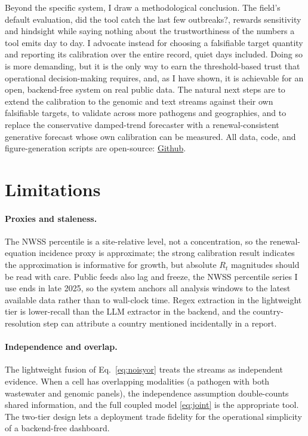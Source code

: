 \documentclass[10pt,twocolumn]{article}
\theoremstyle{definition}
\newcommand{\Rt}{R_t}
\newcommand{\github}{\href{https://github.com/aravinds-kannappan/MOSAIC}{Github}}
\begin{document}
Beyond the specific system, I draw a methodological conclusion. The field's
default evaluation, did the tool catch the last few outbreaks?, rewards
sensitivity and hindsight while saying nothing about the trustworthiness of the
numbers a tool emits day to day. I advocate instead for choosing a falsifiable
target quantity and reporting its calibration over the entire record, quiet days
included. Doing so is more demanding, but it is the only way to earn the
threshold-based trust that operational decision-making requires, and, as I have
shown, it is achievable for an open, backend-free system on real public data. The
natural next steps are to extend the calibration to the genomic and text streams
against their own falsifiable targets, to validate across more pathogens and
geographies, and to replace the conservative damped-trend forecaster with a
renewal-consistent generative forecast whose own calibration can be measured. All
data, code, and figure-generation scripts are open-source: \github.

\section{Limitations}
\label{sec:limitations}

\paragraph{Proxies and staleness.}
The NWSS percentile is a site-relative level, not a concentration, so the
renewal-equation incidence proxy is approximate; the strong calibration result
indicates the approximation is informative for growth, but absolute $\Rt$
magnitudes should be read with care. Public feeds also lag and freeze, the NWSS
percentile series I use ends in late 2025, so the system anchors all analysis
windows to the latest available data rather than to wall-clock time. Regex
extraction in the lightweight tier is lower-recall than the LLM extractor in the
backend, and the country-resolution step can attribute a country mentioned
incidentally in a report.

\paragraph{Independence and overlap.}
The lightweight fusion of Eq.~\eqref{eq:noisyor} treats the streams as
independent evidence. When a cell has overlapping modalities (a pathogen with both
wastewater and genomic panels), the independence assumption double-counts shared
information, and the full coupled model \eqref{eq:joint} is the appropriate tool.
The two-tier design lets a deployment trade fidelity for the operational
simplicity of a backend-free dashboard.
\end{document}
